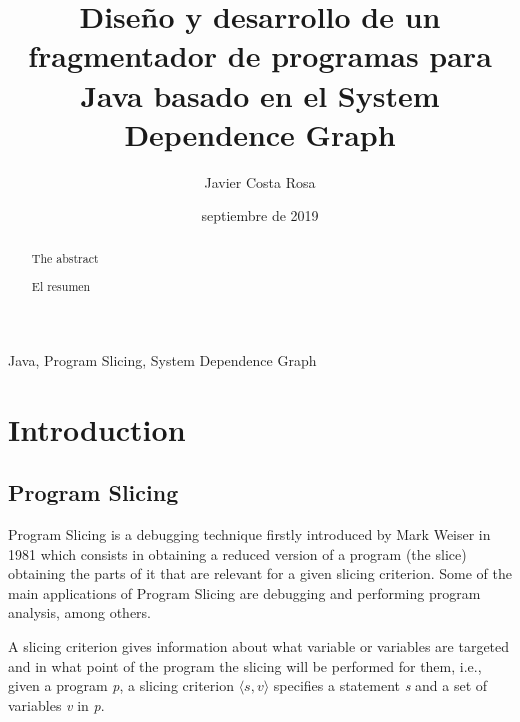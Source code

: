 \documentclass[a4paper]{article}
\title{Diseño y desarrollo de un fragmentador de programas para Java basado en el System Dependence Graph}
\author{Javier Costa Rosa}
\date{septiembre de 2019}
\begin{document}

\maketitle

\begin{abstract}
	The abstract
\end{abstract}

\def\abstractname{{Resumen}}

\begin{abstract}
	El resumen
\end{abstract}

\vspace*{\fill}

\begin{keywords}
\hspace{0cm} Java, Program Slicing, System Dependence Graph
\end{keywords}

\newpage

\tableofcontents

\newpage
 
\setlength{\parskip}{1em}

\section{Introduction} 

\subsection{Program Slicing}

Program Slicing is a debugging technique firstly introduced by Mark Weiser in 1981 \cite{weiserPS} which consists in obtaining a reduced version of a program (the slice) obtaining the parts of it that are relevant for a given slicing criterion. Some of the main applications of Program Slicing are debugging and performing program analysis, among others.

A slicing criterion gives information about what variable or variables are targeted and in what point of the program the slicing will be performed for them, i.e., given a program \textit{p}, a slicing criterion $\langle s, v \rangle$ specifies a statement \textit{s} and a set of variables \textit{v} in \textit{p}. 
\end{document}
